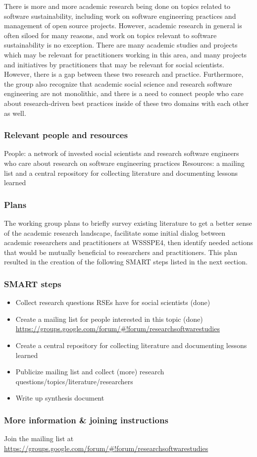 There is more and more academic research being done on topics related to software sustainability, including work on software engineering practices and management of open source projects. However, academic research in general is often siloed for many reasons, and work on topics relevant to software sustainability is no exception. There are many academic studies and projects which may be relevant for practitioners working in this area, and many projects and initiatives by practitioners that may be relevant for social scientists. However, there is a gap between these two research and practice. Furthermore, the group also recognize that academic social science and research software engineering are not monolithic, and there is a need to connect people who care about research-driven best practices inside of these two domains with each other as well.


\subsubsection{Relevant people and resources}

People: a network of invested social scientists and research software engineers who care about research on software engineering practices
Resources: a mailing list and a central repository for collecting literature and documenting lessons learned

\subsubsection{Plans}

The working group plans to briefly survey existing literature to get a better sense of the academic research landscape, facilitate some initial dialog between academic researchers and practitioners at WSSSPE4, then identify needed actions that would be mutually beneficial to researchers and practitioners. This plan resulted in the creation of the following SMART steps listed in the next section.

\subsubsection{SMART steps}

\begin{itemize}
\item Collect research questions RSEs have for social scientists (done)
\item Create a mailing list for people interested in this topic (done) \url{https://groups.google.com/forum/#!forum/researchsoftwarestudies}
\item Create a central repository for collecting literature and documenting lessons learned
\item Publicize mailing list and collect (more) research questions/topics/literature/researchers
\item Write up synthesis document 
\end{itemize}

\subsubsection{More information \& joining instructions}

Join the mailing list at \url{https://groups.google.com/forum/#!forum/researchsoftwarestudies}
